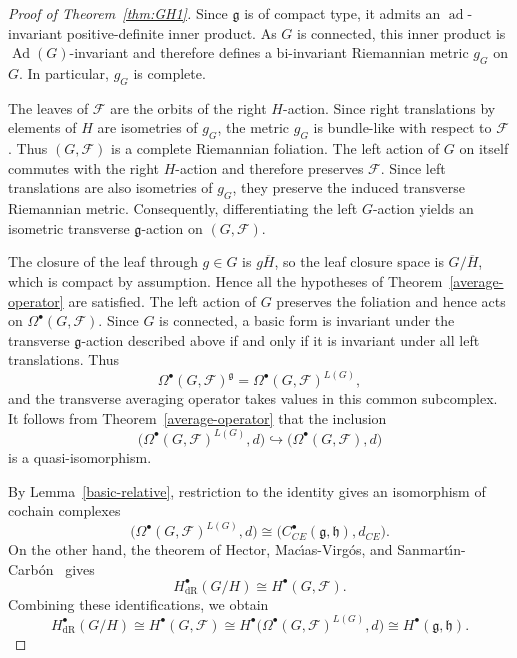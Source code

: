 \documentclass[reqno, 11pt]{amsart}
\theoremstyle{definition}
\theoremstyle{property}
\theoremstyle{remark}
\numberwithin{equation}{section}
\begin{document}
\begin{proof}[Proof of Theorem~\ref{thm:GH1}]
Since $\mathfrak g$ is of compact type, it admits an
$\operatorname{ad}$-invariant positive-definite inner product. As $G$ is
connected, this inner product is $\operatorname{Ad}(G)$-invariant and therefore
defines a bi-invariant Riemannian metric $g_G$ on $G$. In particular, $g_G$ is
complete.

The leaves of $\mathcal F$ are the orbits of the right $H$-action. Since right
translations by elements of $H$ are isometries of $g_G$, the metric $g_G$ is
bundle-like with respect to $\mathcal F$. Thus $(G,\mathcal F)$ is a complete
Riemannian foliation. The left action of $G$ on itself commutes with the right $H$-action and
therefore preserves $\mathcal F$. Since left translations are also isometries
of $g_G$, they preserve the induced transverse Riemannian metric.
Consequently, differentiating the left $G$-action yields an isometric
transverse $\mathfrak g$-action on $(G,\mathcal F)$.

The closure of the leaf through $g\in G$ is $g\overline H$, so the leaf
closure space is $G/\overline H$, which is compact by assumption. Hence all
the hypotheses of Theorem~\ref{average-operator} are satisfied. The left action of $G$ preserves the foliation and hence acts on
$\Omega^\bullet(G,\mathcal F)$. Since $G$ is connected, a basic form is
invariant under the transverse $\mathfrak g$-action described above if and only if it is invariant under all left
translations. Thus
\[
\Omega^\bullet(G,\mathcal F)^{\mathfrak g}
=
\Omega^\bullet(G,\mathcal F)^{L(G)},
\]
and the transverse averaging operator takes values in this common
subcomplex.
It follows from Theorem~\ref{average-operator} that the inclusion
\[
\bigl(\Omega^\bullet(G,\mathcal F)^{L(G)},d\bigr)
\hookrightarrow
\bigl(\Omega^\bullet(G,\mathcal F),d\bigr)
\]
is a quasi-isomorphism.

By Lemma~\ref{basic-relative}, restriction to the identity gives an
isomorphism of cochain complexes
\[
\bigl(\Omega^\bullet(G,\mathcal F)^{L(G)},d\bigr)
\cong
\bigl(C^\bullet_{CE}(\mathfrak g,\mathfrak h),d_{CE}\bigr).
\]
On the other hand, the theorem of Hector, Mac\'{\i}as-Virg\'os, and
Sanmart\'{\i}n-Carb\'on~\cite[Theorem~3.5]{HMS} gives
\[
H^\bullet_{\mathrm{dR}}(G/H)
\cong
H^\bullet(G,\mathcal F).
\]
Combining these identifications, we obtain
\[ H^\bullet_{\mathrm{dR}}(G/H)
\cong H^\bullet(G,\mathcal F) 
\cong
H^\bullet\bigl(\Omega^\bullet(G,\mathcal F)^{L(G)},d\bigr) 
\cong H^\bullet(\mathfrak g,\mathfrak h).
\]
\end{proof}
\end{document}
